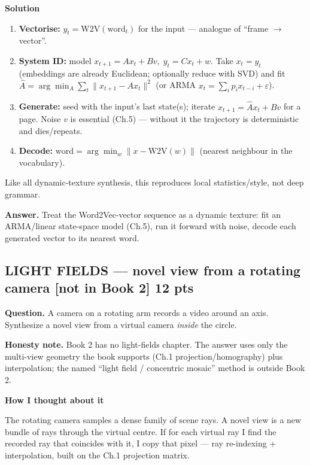 \documentclass[11pt]{article}
\newcommand{\step}[1]{\smallskip\par\noindent\textbf{\textcolor{amber}{#1}}\par\nobreak}
\newcommand{\mapsoob}[1]{{\small\textcolor{oob}{[#1]}}}
\newcommand{\ans}[1]{\begin{answer}\textbf{Answer.} #1\end{answer}}
\begin{document}
\step{Solution}
\begin{enumerate}
  \item \textbf{Vectorise:} $y_t=\text{W2V}(\text{word}_t)$ for the input --- analogue of ``frame $\to$ vector''.
  \item \textbf{System ID:} model $x_{t+1}=Ax_t+Bv,\;y_t=Cx_t+w$. Take $x_t=y_t$ (embeddings are already Euclidean;
  optionally reduce with SVD) and fit $\hat A=\arg\min_A\sum_t\|x_{t+1}-Ax_t\|^2$ (or ARMA
  $x_t=\sum_i p_i x_{t-i}+\varepsilon$).
  \item \textbf{Generate:} seed with the input's last state(s); iterate $x_{t+1}=\hat A x_t+Bv$ for a page. Noise
  $v$ is essential (Ch.5) --- without it the trajectory is deterministic and dies/repeats.
  \item \textbf{Decode:} $\text{word}=\arg\min_w\|x-\text{W2V}(w)\|$ (nearest neighbour in the vocabulary).
\end{enumerate}
Like all dynamic-texture synthesis, this reproduces local statistics/style, not deep grammar.
\ans{Treat the Word2Vec-vector sequence as a dynamic texture: fit an ARMA/linear state-space model (Ch.5), run it
forward with noise, decode each generated vector to its nearest word.}

\subsection{LIGHT FIELDS --- novel view from a rotating camera \hfill \mapsoob{not in Book 2} \hfill \textnormal{\small 12 pts}}
\begin{qbox}\textbf{Question.} A camera on a rotating arm records a video around an axis. Synthesize a novel view
from a virtual camera \emph{inside} the circle.\end{qbox}

\begin{notebox}\textbf{Honesty note.} Book 2 has no light-fields chapter. The answer uses only the multi-view
geometry the book supports (Ch.1 projection/homography) plus interpolation; the named ``light field / concentric
mosaic'' method is outside Book 2.\end{notebox}

\step{How I thought about it}
The rotating camera samples a dense family of scene rays. A novel view is a new bundle of rays through the virtual
centre. If for each virtual ray I find the recorded ray that coincides with it, I copy that pixel --- ray
re-indexing + interpolation, built on the Ch.1 projection matrix.
\end{document}

